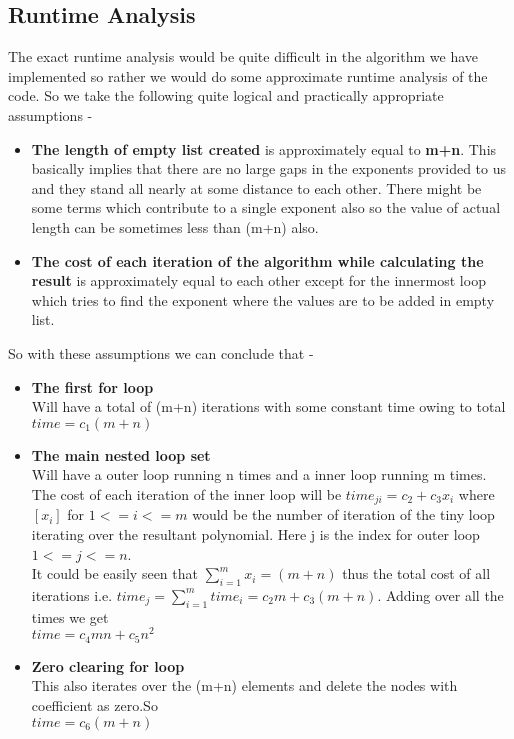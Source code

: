 \documentclass[20pt]{article}
\begin{document}
\newpage
\subsection{Runtime Analysis}
The exact runtime analysis would be quite difficult in the algorithm we have implemented so rather we would do some approximate runtime analysis of the code.
So we take the following quite logical and practically appropriate assumptions -

\begin{itemize}
\item \textbf{The length of empty list created} is approximately equal to \textbf{m+n}. This basically implies that there are no large gaps in the exponents provided to us and they stand all nearly at some distance to each other. There might be some terms which contribute to a single exponent also so the value of actual length can be sometimes less than (m+n) also.
\item \textbf{The cost of each iteration of the algorithm while calculating the result} is approximately equal to each other except for the innermost loop which tries to find the exponent where the values are to be added in empty list.
\end{itemize}

So with these assumptions we can conclude that -
\begin{itemize}
\item \textbf{The first for loop} \\
Will have a total of (m+n) iterations with some constant time owing to total \\
\textbf{$ time = c_1(m+n) $}

\item \textbf{The main nested loop set} \\
Will have a outer loop running n times and a inner loop running m times. The cost of each iteration of the inner loop will be $ time_{ji} = c_2 + c_3x_i $  where  $[x_i]$ for $ 1 <= i <= m$ would be the number of iteration of the tiny loop iterating over the resultant polynomial. Here j is the index for outer loop $ 1 <= j <= n $. \\
It could be easily seen that  $ \sum _{i=1}^{m} {x_i} = (m+n) $ thus the total cost of all iterations  i.e. $ time_j = \sum _{i=1}^{m} {time_i} = c_2m + c_3(m+n) $.
Adding over all the times we get  \\
\textbf{$ time = c_4mn + c_5n^2$}

\item \textbf{Zero clearing for loop} \\
This also iterates over the (m+n) elements and delete the nodes with coefficient as zero.So \\
\textbf{$ time = c_6(m+n) $}
\end{itemize}
\end{document}
